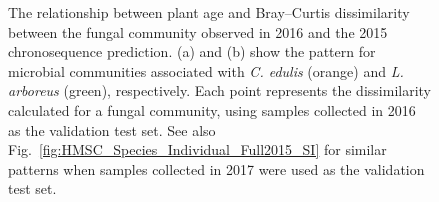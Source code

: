 \clearpage
\begin{figure}[h]
	\centering
		\caption[The relationship between plant age and Bray--Curtis dissimilarity between the fungal community observed in 2016 and the 2015 chronosequence prediction.]
		{\hspace{1mm} The relationship between plant age and Bray--Curtis dissimilarity between the fungal community observed in 2016 and the 2015 chronosequence prediction.
		(a) and (b) show the pattern for microbial communities associated with \textit{C. edulis} (orange) and \textit{L. arboreus} (green), respectively. 
		Each point represents the dissimilarity calculated for a fungal community, using samples collected in 2016 as the validation test set. See also Fig.~\ref{fig:HMSC_Species_Individual_Full2015_SI} for similar patterns when samples collected in 2017 were used as the validation test set.
		}
	\label{fig:HMSC_Species_Individual_Full2015}
\end{figure}



